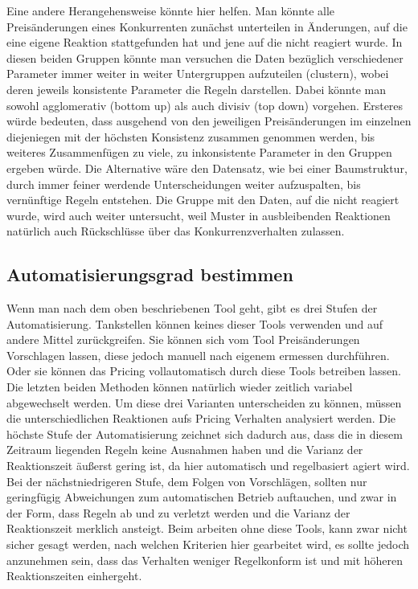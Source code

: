 \documentclass[12pt,a4paper,bibliography=totocnumbered,listof=totocnumbered]{scrartcl}
\begin{document}
Eine andere Herangehensweise könnte hier helfen. Man könnte alle Preisänderungen eines Konkurrenten zunächst unterteilen in Änderungen, auf die eine eigene Reaktion stattgefunden hat und jene auf die nicht reagiert wurde. In diesen beiden Gruppen könnte man versuchen die Daten bezüglich verschiedener Parameter immer weiter in weiter Untergruppen aufzuteilen (clustern), wobei deren jeweils konsistente Parameter die Regeln darstellen. Dabei könnte man sowohl agglomerativ (bottom up) als auch divisiv (top down) vorgehen. Ersteres würde bedeuten, dass ausgehend von den jeweiligen Preisänderungen im einzelnen diejeniegen mit der höchsten Konsistenz zusammen genommen werden, bis weiteres Zusammenfügen zu viele, zu inkonsistente Parameter in den Gruppen ergeben würde. Die Alternative wäre den Datensatz, wie bei einer Baumstruktur, durch immer feiner werdende Unterscheidungen weiter aufzuspalten, bis vernünftige Regeln entstehen. Die Gruppe mit den Daten, auf die nicht reagiert wurde, wird auch weiter untersucht, weil Muster in ausbleibenden Reaktionen natürlich auch Rückschlüsse über das Konkurrenzverhalten zulassen.

\subsection{Automatisierungsgrad bestimmen}

Wenn man nach dem oben beschriebenen Tool geht, gibt es drei Stufen der Automatisierung. Tankstellen können keines dieser Tools verwenden und auf andere Mittel zurückgreifen. Sie können sich vom Tool Preisänderungen Vorschlagen lassen, diese jedoch manuell nach eigenem ermessen durchführen. Oder sie können das Pricing vollautomatisch durch diese Tools betreiben lassen. Die letzten beiden Methoden können natürlich wieder zeitlich variabel abgewechselt werden. Um diese drei Varianten unterscheiden zu können, müssen die unterschiedlichen Reaktionen aufs Pricing Verhalten analysiert werden. Die höchste Stufe der Automatisierung zeichnet sich dadurch aus, dass die in diesem Zeitraum liegenden Regeln keine Ausnahmen haben und die Varianz der Reaktionszeit äußerst gering ist, da hier automatisch und regelbasiert agiert wird. Bei der nächstniedrigeren Stufe, dem Folgen von Vorschlägen, sollten nur geringfügig Abweichungen zum automatischen Betrieb auftauchen, und zwar in der Form, dass Regeln ab und zu verletzt werden und die Varianz der Reaktionszeit merklich ansteigt. Beim arbeiten ohne diese Tools, kann zwar nicht sicher gesagt werden, nach welchen Kriterien hier gearbeitet wird, es sollte jedoch anzunehmen sein, dass das Verhalten weniger Regelkonform ist und mit höheren Reaktionszeiten einhergeht.
\end{document}
